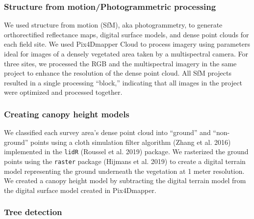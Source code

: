 \documentclass[]{article}
\begin{document}
\subsubsection{Structure from motion/Photogrammetric
processing}\label{structure-from-motionphotogrammetric-processing}

We used structure from motion (SfM), aka photogrammetry, to generate
orthorectified reflectance maps, digital surface models, and dense point
clouds for each field site. We used Pix4Dmapper Cloud to process imagery
using parameters ideal for images of a densely vegetated area taken by a
multispectral camera. For three sites, we processed the RGB and the
multispectral imagery in the same project to enhance the resolution of
the dense point cloud. All SfM projects resulted in a single processing
``block,'' indicating that all images in the project were optimized and
processed together.

\subsubsection{Creating canopy height
models}\label{creating-canopy-height-models}

We classified each survey area's dense point cloud into ``ground'' and
``non-ground'' points using a cloth simulation filter algorithm (Zhang
et al. 2016) implemented in the \texttt{lidR} (Roussel et al. 2019)
package. We rasterized the ground points using the \texttt{raster}
package (Hijmans et al. 2019) to create a digital terrain model
representing the ground underneath the vegetation at 1 meter resolution.
We created a canopy height model by subtracting the digital terrain
model from the digital surface model created in Pix4Dmapper.

\subsubsection{Tree detection}\label{tree-detection}
\end{document}

